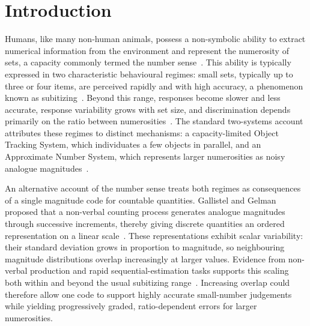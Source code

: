 \documentclass[Afour,sageh,times]{sagej}
\begin{document}

\maketitle

\section{Introduction}


Humans, like many non-human animals, possess a non-symbolic ability to extract numerical information from the environment and represent the numerosity of sets, a capacity commonly termed the number sense~\citep{dehaene_number_2011,nieder_neuronal_2016}. This ability is typically expressed in two characteristic behavioural regimes: small sets, typically up to three or four items, are perceived rapidly and with high accuracy, a phenomenon known as subitizing~\citep{kaufman_discrimination_1949, mandler_subitizing_1982}. Beyond this range, responses become slower and less accurate, response variability grows with set size, and discrimination depends primarily on the ratio between numerosities~\citep{feigenson_core_2004,dehaene_number_2011}.
The standard two-systems account attributes these regimes to distinct mechanisms: a capacity-limited Object Tracking System, which individuates a few objects in parallel, and an Approximate Number System, which represents larger numerosities as noisy analogue magnitudes~\citep{feigenson_representations_2002, piazza_subitizing_2011}.

An alternative account of the number sense treats both regimes as consequences of a single magnitude code for countable quantities. Gallistel and Gelman proposed that a non-verbal counting process generates analogue magnitudes through successive increments, thereby giving discrete quantities an ordered representation on a linear scale~\citep{gallistel_preverbal_1992,gallistel_non-verbal_2000}. These representations exhibit scalar variability: their standard deviation grows in proportion to magnitude, so neighbouring magnitude distributions overlap increasingly at larger values. Evidence from non-verbal production and rapid sequential-estimation tasks supports this scaling both within and beyond the usual subitizing range~\citep{whalen_nonverbal_1999,cordes_variability_2001}. Increasing overlap could therefore allow one code to support highly accurate small-number judgements while yielding progressively graded, ratio-dependent errors for larger numerosities.
\end{document}
